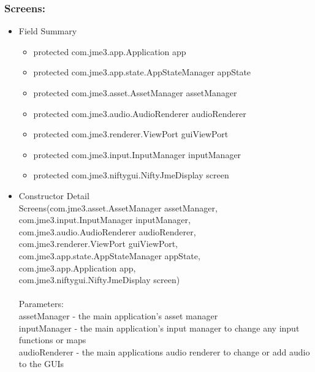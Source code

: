 \documentclass[letterpaper]{article}
\begin{document}
								\subsubsection*{Screens:}
								\vspace{0.1in}	
									\begin{itemize}
										\item	Field Summary
												\begin{itemize}
													\item	protected com.jme3.app.Application	app 
													\item	protected com.jme3.app.state.AppStateManager	appState 
													\item	protected com.jme3.asset.AssetManager	assetManager 
													\item	protected com.jme3.audio.AudioRenderer	audioRenderer 
													\item	protected com.jme3.renderer.ViewPort	guiViewPort 
													\item	protected com.jme3.input.InputManager	inputManager 
													\item	protected com.jme3.niftygui.NiftyJmeDisplay	screen
												\end{itemize}
										\item	Constructor Detail \\
												Screens(com.jme3.asset.AssetManager assetManager, \\
				      com.jme3.input.InputManager inputManager, \\
				      com.jme3.audio.AudioRenderer audioRenderer, \\
				      com.jme3.renderer.ViewPort guiViewPort, \\
				      com.jme3.app.state.AppStateManager appState, \\
				      com.jme3.app.Application app, \\
				      com.jme3.niftygui.NiftyJmeDisplay screen) \\ \\
												Parameters: \\
												assetManager - the main application's asset manager \\
												inputManager - the main application's input manager to change any input functions or maps \\
												audioRenderer - the main applications audio renderer to change or add audio to the GUIs \\

\end{itemize}
\end{document}
